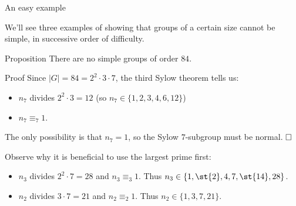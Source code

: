 \documentclass[8pt, handout]{beamer}
\newcommand{\Pause}{}      %
\begin{document}
\begin{frame}{An easy example} 

  We'll see three examples of showing that groups of a certain size
  cannot be simple, in successive order of difficulty.

  \smallskip\Pause

  \begin{block}{Proposition}
    There are no simple groups of order $84$.
  \end{block}

  \Pause

  \begin{exampleblock}{Proof} 
    Since $|G|=84=2^2\cdot 3\cdot 7$, the third Sylow theorem tells us: \Pause
    \begin{itemize}
      \item $n_7$ divides $2^2\cdot 3=12$ (so $n_7\in\{1,2,3,4,6,12\}$) \Pause
      \item $n_7\equiv_7 1$. \Pause
    \end{itemize}
    \pause The only possibility is that $n_7=1$, so the Sylow $7$-subgroup
    must be normal. $\hfill\Box$
  \end{exampleblock}

  \smallskip\Pause

  Observe why it is beneficial to use the largest prime first:
 
  \smallskip

  \begin{itemize}
    \item $n_3$ divides $2^2\cdot 7=28$ and $n_3\equiv_3 1$. \Pause Thus
      $n_3\in\{1,\text{\st{2}},4,7,\text{\st{14}},28\}$. \smallskip\Pause
    \item $n_2$ divides $3\cdot 7=21$ and $n_2\equiv_2 1$. \Pause Thus
      $n_2\in\{1,3,7,21\}$.
  \end{itemize}

\end{frame}

\end{document}
